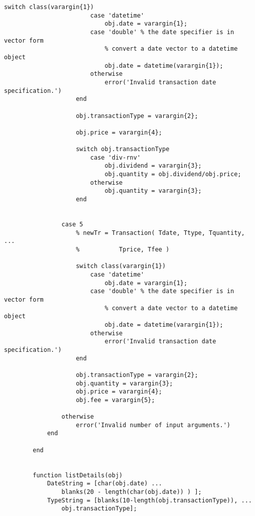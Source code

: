 \begin{lstlisting}[style=Matlab-editor, caption={The \texttt{Transaction} class, as enhanced to support \texttt{Asset} value calculations.}, label={lst:TransactionForCalculations}]
                    switch class(varargin{1})
                        case 'datetime'
                            obj.date = varargin{1};
                        case 'double' % the date specifier is in vector form
                            % convert a date vector to a datetime object
                            obj.date = datetime(varargin{1});
                        otherwise
                            error('Invalid transaction date specification.')
                    end
                    
                    obj.transactionType = varargin{2};
                    
                    obj.price = varargin{4};
                    
                    switch obj.transactionType
                        case 'div-rnv'
                            obj.dividend = varargin{3};
                            obj.quantity = obj.dividend/obj.price;
                        otherwise
                            obj.quantity = varargin{3};
                    end
                    
                    
                case 5
                    % newTr = Transaction( Tdate, Ttype, Tquantity, ...
                    %           Tprice, Tfee )
                    
                    switch class(varargin{1})
                        case 'datetime'
                            obj.date = varargin{1};
                        case 'double' % the date specifier is in vector form
                            % convert a date vector to a datetime object
                            obj.date = datetime(varargin{1});
                        otherwise
                            error('Invalid transaction date specification.')
                    end
                    
                    obj.transactionType = varargin{2};
                    obj.quantity = varargin{3};
                    obj.price = varargin{4};
                    obj.fee = varargin{5};
                    
                otherwise
                    error('Invalid number of input arguments.')
            end
            
        end
        
        
        function listDetails(obj)
            DateString = [char(obj.date) ...
                blanks(20 - length(char(obj.date)) ) ];
            TypeString = [blanks(10-length(obj.transactionType)), ...
                obj.transactionType];
            

\end{lstlisting}
